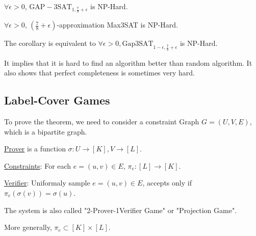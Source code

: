 
\begin{theorem}\label{thm:gap3sat}
    $ \forall \epsilon>0 $,  $ \mathrm{GAP-3SAT}_{1,\frac{7}{8}+\epsilon} $ is NP-Hard.  
\end{theorem}
\begin{corollary}
    $ \forall \epsilon>0 $,  $ (\frac{7}{8}+\epsilon) $-approximation Max3SAT is NP-Hard. 
\end{corollary}

The corollary is equivalent to  $ \forall \epsilon>0,\mathrm{Gap3SAT}_{1-\epsilon,\frac{7}{8}+\epsilon} $ is NP-Hard.

\begin{remark}
    It implies that  it is hard to find an algorithm better than random algorithm. It also shows that perfect completeness is sometimes very hard.
\end{remark}

\subsection{Label-Cover Games}

To prove the theorem, we need to consider a constraint Graph  $ G=(U,V,E) $, which is a bipartite graph. 

\underline{Prover} is a function  $ \sigma:U\rightarrow [K],V\rightarrow [L] $. 

\underline{Constraints}: For each  $ e=(u,v)\in E $,  $ \pi_e:[L]\rightarrow [K] $.

\underline{Verifier}: Uniformaly sample  $ e=(u,v)\in  E $, accepts only if  $ \pi_e(\sigma(v))=\sigma(u) $.

The system is also called  "2-Prover-1Verifier  Game" or "Projection Game".

More generally,  $ \pi_e\subset [K]\times [L] $.


